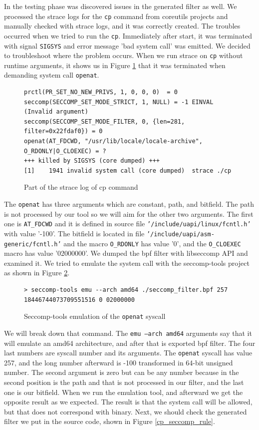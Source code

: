 In the testing phase was discovered issues in the generated filter as well. We
processed the strace logs for the \texttt{cp} command from coreutils projects
and manually checked with strace logs, and it was correctly created. The
troubles occurred when we tried to run the \texttt{cp}. Immediately after start,
it was terminated with signal \texttt{SIGSYS} and error message 'bad system
call' was emitted. We decided to troubleshoot where the problem occurs. When we
run strace on \texttt{cp} without runtime arguments, it shows us in Figure
\ref{cp_strace_error} that it was terminated when demanding system call
\texttt{openat}.
\begin{figure}[h]
	\label{cp_strace_error}
	\lstset{style=npl}
	\begin{lstlisting}
prctl(PR_SET_NO_NEW_PRIVS, 1, 0, 0, 0)  = 0
seccomp(SECCOMP_SET_MODE_STRICT, 1, NULL) = -1 EINVAL (Invalid argument)
seccomp(SECCOMP_SET_MODE_FILTER, 0, {len=281, filter=0x22fdaf0}) = 0
openat(AT_FDCWD, "/usr/lib/locale/locale-archive", O_RDONLY|O_CLOEXEC) = ?
+++ killed by SIGSYS (core dumped) +++
[1]    1941 invalid system call (core dumped)  strace ./cp
	\end{lstlisting}
	\caption{Part of the strace log of cp command}
\end{figure}

The \texttt{openat} has three arguments which are constant, path, and bitfield.
The path is not processed by our tool so we will aim for the other two
arguments. The first one is \texttt{AT\_FDCWD} and it is defined in source file
\texttt{'/include/uapi/linux/fcntl.h'} with value '-100'. The bitfield
is located in file \texttt{'/include/uapi/asm-generic/fcntl.h'} and the macro
\texttt{O\_RDONLY} has value '0', and the \texttt{O\_CLOEXEC} macro has value
'02000000'. We dumped the bpf filter with libseccomp API and examined it. We
tried to emulate the system call with the seccomp-tools project as shown in
Figure \ref{emulation_cp}.

\begin{figure}[h]
	\lstset{style=npl}
\begin{lstlisting}
> seccomp-tools emu --arch amd64 ./seccomp_filter.bpf 257 18446744073709551516 0 02000000
\end{lstlisting}
	\caption{Seccomp-tools emulation of the \texttt{openat} syscall}
	\label{emulation_cp}
\end{figure}

We will break down that command. The \texttt{emu --arch amd64}  arguments say
that it will emulate an amd64 architecture, and after that is exported bpf
filter. The four last numbers are syscall number and its arguments.
The \texttt{openat} syscall has value 257, and the long number afterward is -100
transformed in 64-bit unsigned number. The second argument is zero but can be
any number because in the second position is the path and that is not processed
in our filter, and the last one is our bitfield. When we run the emulation tool,
and afterward we get the opposite result as we expected. The result is that the
system call will be allowed, but that does not correspond with binary. Next, we
should check the generated filter we put in the source code, shown in Figure
\ref{cp_seccomp_rule}.

